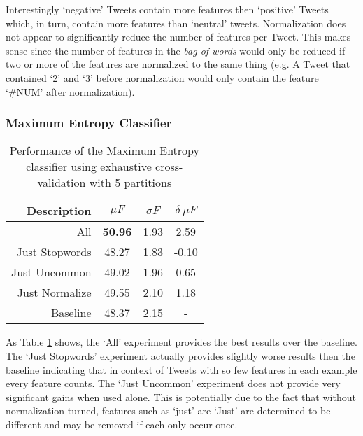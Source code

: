 \documentclass[final,3p,12pt]{elsarticle}
\begin{document}

Interestingly `negative' Tweets contain more features then `positive' Tweets
which, in turn, contain more features than `neutral' tweets. Normalization does
not appear to significantly reduce the number of features per Tweet. This makes
sense since the number of features in the \textit{bag-of-words} would only be
reduced if two or more of the features are normalized to the same thing (e.g.
A Tweet that contained `2' and `3' before normalization would only contain the
feature `\#NUM' after normalization).

\subsubsection{Maximum Entropy Classifier}

\begin{table}[H]
    \begin{center}
    \begin{tabular}{|r||c|c|c|}
        \hline
        Description    & $\mu F$ & $\sigma F$ & $\delta\ \mu F$ \\
        \hline
        All            & \textbf{50.96} & 1.93 &  2.59 \\
        Just Stopwords & 48.27   & 1.83 & -0.10 \\
        Just Uncommon  & 49.02   & 1.96 &  0.65 \\
        Just Normalize & 49.55   & 2.10 &  1.18 \\
        Baseline       & 48.37   & 2.15 & - \\
        \hline
    \end{tabular}
    \end{center}
    \caption{Performance of the Maximum Entropy classifier using exhaustive
    cross-validation with 5 partitions}
    \label{table:maxent-results}
\end{table}

As Table \ref{table:maxent-results} shows, the `All' experiment provides the
best results over the baseline. The `Just Stopwords' experiment actually
provides slightly worse results then the baseline indicating that in context of
Tweets with so few features in each example every feature counts. The `Just
Uncommon' experiment does not provide very significant gains when used alone.
This is potentially due to the fact that without normalization turned,
features such as `just' are `Just' are determined to be different and may be
removed if each only occur once.
\end{document}
